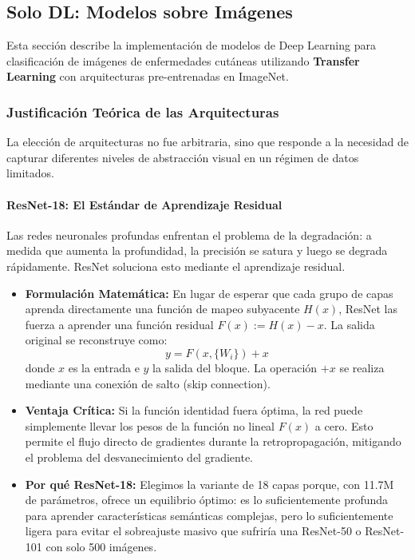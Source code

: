 \documentclass[12pt,a4paper]{article}
\begin{document}
\newpage

\subsection{Solo DL: Modelos sobre Imágenes}
\label{sec:solo_dl}

Esta sección describe la implementación de modelos de Deep Learning para clasificación de imágenes de enfermedades cutáneas utilizando \textbf{Transfer Learning} con arquitecturas pre-entrenadas en ImageNet.

\subsubsection{Justificación Teórica de las Arquitecturas}

La elección de arquitecturas no fue arbitraria, sino que responde a la necesidad de capturar diferentes niveles de abstracción visual en un régimen de datos limitados.

\paragraph{ResNet-18: El Estándar de Aprendizaje Residual}
Las redes neuronales profundas enfrentan el problema de la degradación: a medida que aumenta la profundidad, la precisión se satura y luego se degrada rápidamente. ResNet \cite{he_deep_2015} soluciona esto mediante el aprendizaje residual.
\begin{itemize}
    \item \textbf{Formulación Matemática:} En lugar de esperar que cada grupo de capas aprenda directamente una función de mapeo subyacente $H(x)$, ResNet las fuerza a aprender una función residual $F(x) := H(x) - x$. La salida original se reconstruye como:
    \begin{equation}
        y = F(x, \{W_i\}) + x
    \end{equation}
    donde $x$ es la entrada e $y$ la salida del bloque. La operación $+x$ se realiza mediante una conexión de salto (skip connection).
    \item \textbf{Ventaja Crítica:} Si la función identidad fuera óptima, la red puede simplemente llevar los pesos de la función no lineal $F(x)$ a cero. Esto permite el flujo directo de gradientes durante la retropropagación, mitigando el problema del desvanecimiento del gradiente.
    \item \textbf{Por qué ResNet-18:} Elegimos la variante de 18 capas porque, con 11.7M de parámetros, ofrece un equilibrio óptimo: es lo suficientemente profunda para aprender características semánticas complejas, pero lo suficientemente ligera para evitar el sobreajuste masivo que sufriría una ResNet-50 o ResNet-101 con solo 500 imágenes.
\end{itemize}
\end{document}
